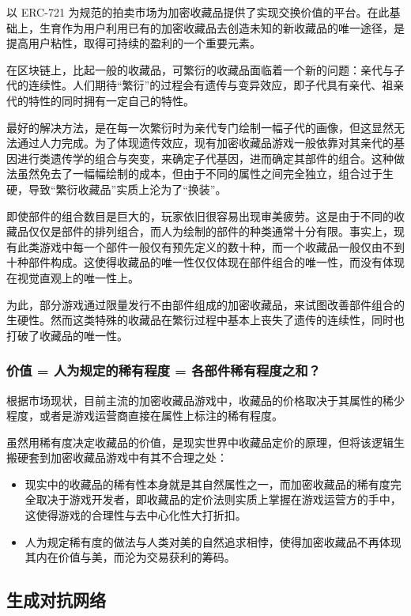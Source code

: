 \documentclass[a4paper]{article}
\begin{document}
以 ERC-721 为规范的拍卖市场为加密收藏品提供了实现交换价值的平台。在此基础上，生育作为用户利用已有的加密收藏品去创造未知的新收藏品的唯一途径，是提高用户粘性，取得可持续的盈利的一个重要元素。

在区块链上，比起一般的收藏品，可繁衍的收藏品面临着一个新的问题：亲代与子代的连续性。人们期待“繁衍”的过程会有遗传与变异效应，即子代具有亲代、祖亲代的特性的同时拥有一定自己的特性。

最好的解决方法，是在每一次繁衍时为亲代专门绘制一幅子代的画像，但这显然无法通过人力完成。为了体现遗传效应，现有加密收藏品游戏一般依靠对其亲代的基因进行类遗传学的组合与突变，来确定子代基因，进而确定其部件的组合\cite{cryptokitties,etherwaifu,cryptofighters}。这种做法虽然免去了一幅幅绘制的成本，但由于不同的属性之间完全独立，组合过于生硬，导致``繁衍收藏品''实质上沦为了``换装''。

即使部件的组合数目是巨大的，玩家依旧很容易出现审美疲劳。这是由于不同的收藏品仅仅是部件的排列组合，而人为绘制的部件的种类通常十分有限。事实上，现有此类游戏中每一个部件一般仅有预先定义的数十种，而一个收藏品一般仅由不到十种部件构成。这使得收藏品的唯一性仅仅体现在部件组合的唯一性，而没有体现在视觉直观上的唯一性上。

为此，部分游戏通过限量发行不由部件组成的加密收藏品，来试图改善部件组合的生硬性。然而这类特殊的收藏品在繁衍过程中基本上丧失了遗传的连续性，同时也打破了收藏品的唯一性。

\subsubsection{价值 = 人为规定的稀有程度 = 各部件稀有程度之和？}

根据市场现状，目前主流的加密收藏品游戏中，收藏品的价格取决于其属性的稀少程度，或者是游戏运营商直接在属性上标注的稀有程度。

虽然用稀有度决定收藏品的价值，是现实世界中收藏品定价的原理，但将该逻辑生搬硬套到加密收藏品游戏中有其不合理之处：

\begin{itemize}
\item 现实中的收藏品的稀有性本身就是其自然属性之一，而加密收藏品的稀有度完全取决于游戏开发者，即收藏品的定价法则实质上掌握在游戏运营方的手中，这使得游戏的合理性与去中心化性大打折扣。
\item 人为规定稀有度的做法与人类对美的自然追求相悖，使得加密收藏品不再体现其内在价值与美，而沦为交易获利的筹码。
\end{itemize}

\subsection{生成对抗网络}
\end{document}
